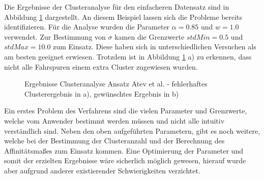 Die Ergebnisse der Clusteranalyse für den einfacheren Datensatz sind in Abbildung \ref{fig:real_results_atev1}
dargestellt. An diesem Beispiel lassen sich die Probleme bereits identifizieren.
Für die Analyse wurden die Parameter $\alpha = 0.85$ und $w = 1.0$ verwendet.
Zur Bestimmung von $\sigma$ kamen die Grenzwerte $stdMin = 0.5$ und $stdMax = 10.0$ zum Einsatz.
Diese haben sich in unterschiedlichen Versuchen als am besten geeignet erwiesen.
Trotzdem ist in Abbildung \ref{fig:real_results_atev1} a) zu erkennen, dass nicht alle Fahrspuren einem
extra Cluster zugewiesen wurden.

\begin{figure}[H]
    \centering
    \qquad \qquad
    \caption[Ergebnisse Clusteranalyse Ansatz Atev et al.]
            {Ergebnisse Clusteranalyse Ansatz Atev et al. - fehlerhaftes Clusterergebnis in a), gewünschtes Ergebnis in b)}
    \label{fig:real_results_atev1}
\end{figure}

Ein erstes Problem des Verfahrens sind die vielen Parameter und Grenzwerte, welche vom Anwender bestimmt werden müssen und
nicht alle intuitiv verständlich sind.
Neben den oben aufgeführten Parametern, gibt es noch weitere, welche bei der Bestimmung der Clusteranzahl und der
Berechnung des Affinitätsmaßes zum Einsatz kommen.
Eine Optimierung der Parameter und somit der erzielten Ergebnisse wäre sicherlich möglich gewesen,
hierauf wurde aber aufgrund anderer existierender Schwierigkeiten verzichtet.

